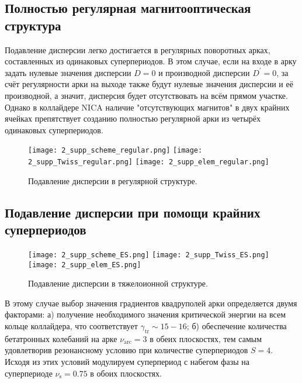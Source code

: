 \subsection{Полностью регулярная магнитооптическая структура}\label{subsec:transition_variation/disp_supperssion/regular}

\par \par Подавление дисперсии легко достигается в регулярных поворотных арках, составленных из одинаковых суперпериодов. В этом случае, если на входе в арку задать нулевые значения дисперсии $D=0$ и производной дисперсии $D^{\prime}=0$, за счёт регулярности арки на выходе также будут нулевые значения дисперсии и её производной, а значит, дисперсия будет отсутствовать на всём прямом участке. Однако в коллайдере NICA наличие "отсутствующих магнитов" в двух крайних ячейках препятствует созданию полностью регулярной арки из четырёх одинаковых суперпериодов.

\begin{figure} [h!]
   \center
   \texttt{[image: 2\_supp\_scheme\_regular.png]}
   \texttt{[image: 2\_supp\_Twiss\_regular.png]}
   \texttt{[image: 2\_supp\_elem\_regular.png]}
   \caption{Подавление дисперсии в регулярной структуре.}
   \label{fig:2_disp_supp_full_regular}
\end{figure}
	
\subsection{Подавление дисперсии при помощи крайних суперпериодов}\label{subsec:transition_variation/disp_supperssion/ES}

\par	
\begin{figure} [h!]
   \center
   \texttt{[image: 2\_supp\_scheme\_ES.png]}
   \texttt{[image: 2\_supp\_Twiss\_ES.png]}
   \texttt{[image: 2\_supp\_elem\_ES.png]}
   \caption{Подавление дисперсии в тяжелоионной структуре.}
   \label{fig:2_disp_supp_ES}
\end{figure}		

\par В этому случае выбор значения градиентов квадруполей арки определяется двумя факторами:
	а) получение необходимого значения критической энергии на всем кольце коллайдера, что соответствует $\gamma_{\text{tr}}\sim15-16$;
	б) обеспечение количества бетатронных колебаний на арке $\nu_{\text{arc}}=3$ в обеих плоскостях, тем самым удовлетворив резонансному условию при количестве суперпериодов $S=4$. Исходя из этих условий модулируем суперпериод с набегом фазы на суперпериоде $\nu_{\text{s}}=0.75$ в обоих плоскостях.

